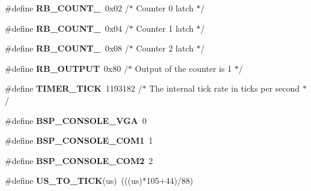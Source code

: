 \begin{DoxyCompactItemize}
\item 
\mbox{\label{group__RTEMSBSPsI386_gab1cb810c0505c4e80f44b606135081ae}} 
\#define {\bfseries R\+B\+\_\+\+C\+O\+U\+N\+T\+\_}~0x02	       /$\ast$ Counter 0 latch 		 $\ast$/
\item 
\mbox{\label{group__RTEMSBSPsI386_ga89f2a446a8458714467b5d3b8c5f6045}} 
\#define {\bfseries R\+B\+\_\+\+C\+O\+U\+N\+T\+\_}~0x04	       /$\ast$ Counter 1 latch 		 $\ast$/
\item 
\mbox{\label{group__RTEMSBSPsI386_ga99f0b9bcc7a34d58b2ca09d45b72cff4}} 
\#define {\bfseries R\+B\+\_\+\+C\+O\+U\+N\+T\+\_}~0x08	       /$\ast$ Counter 2 latch 		 $\ast$/
\item 
\mbox{\label{group__RTEMSBSPsI386_gaba886a10ab7f8975350c2baa4f915e3d}} 
\#define {\bfseries R\+B\+\_\+\+O\+U\+T\+P\+UT}~0x80	       /$\ast$ Output of the counter is 1 	 $\ast$/
\item 
\mbox{\label{group__RTEMSBSPsI386_ga79f68dadd4ade072fc7121cfe2c40b30}} 
\#define {\bfseries T\+I\+M\+E\+R\+\_\+\+T\+I\+CK}~1193182  /$\ast$ The internal tick rate in ticks per second $\ast$/
\item 
\mbox{\label{group__RTEMSBSPsI386_gaa60f8337a68531109f6b9f61bef39625}} 
\#define {\bfseries B\+S\+P\+\_\+\+C\+O\+N\+S\+O\+L\+E\+\_\+\+V\+GA}~0
\item 
\mbox{\label{group__RTEMSBSPsI386_ga79dc1f452fe2a14bd7c2887e445011cb}} 
\#define {\bfseries B\+S\+P\+\_\+\+C\+O\+N\+S\+O\+L\+E\+\_\+\+C\+O\+M1}~1
\item 
\mbox{\label{group__RTEMSBSPsI386_ga4f1b518b9f83ff11f8b1ad98a9a94f11}} 
\#define {\bfseries B\+S\+P\+\_\+\+C\+O\+N\+S\+O\+L\+E\+\_\+\+C\+O\+M2}~2
\item 
\mbox{\label{group__RTEMSBSPsI386_gad1c72fa51e1e9af26d380479bdd103ec}} 
\#define {\bfseries U\+S\+\_\+\+T\+O\+\_\+\+T\+I\+CK}(us)~(((us)$\ast$105+44)/88)
\item 
\mbox{\label{group__RTEMSBSPsI386_gaa0cf8253a02d3fd4d8aff28122cacab9}} 

\end{DoxyCompactItemize}
